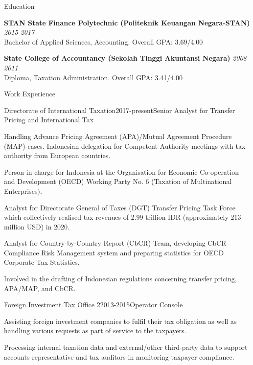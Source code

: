 \documentclass{resume}
\begin{document}
\begin{rSection}{Education}


{\bf STAN State Finance Polytechnic (Politeknik Keuangan Negara-STAN)} \hfill {\em 2015-2017} 
\\ Bachelor of Applied Sciences, Accounting.\hfill { Overall GPA: 3.69/4.00 }

{\bf State College of Accountancy (Sekolah Tinggi Akuntansi Negara)} \hfill {\em 2008-2011} 
\\ Diploma, Taxation Administration.\hfill { Overall GPA: 3.41/4.00 }

\end{rSection}

\begin{rSection}{Work Experience}
\begin{rSubsection}{Directorate of International Taxation}{2017-present}{Senior Analyst for Transfer Pricing and International Tax}{}
 \item Handling Advance Pricing Agreement (APA)/Mutual Agreement Procedure (MAP) cases. Indonesian delegation for Competent Authority meetings with tax authority from European countries.
 \item Person-in-charge for Indonesia at the Organisation for Economic Co-operation and Development (OECD) Working Party No. 6 (Taxation of Multinational Enterprises).
 \item Analyst for Directorate General of Taxes (DGT) Transfer Pricing Task Force which collectively realised tax revenues of 2.99 trillion IDR (approximately 213 million USD) in 2020.
 \item Analyst for Country-by-Country Report (CbCR) Team, developing CbCR Compliance Risk Management system and preparing statistics for OECD Corporate Tax Statistics.
 \item Involved in the drafting of Indonesian regulations concerning transfer pricing, APA/MAP, and CbCR.
\end{rSubsection}
\begin{rSubsection}{Foreign Investment Tax Office 2}{2013-2015}{Operator Console}{}
 \item Assisting foreign investment companies to fulfil their tax obligation as well as handling various requests as part of service to the taxpayers.
 \item Processing internal taxation data and external/other third-party data to support accounts representative and tax auditors in monitoring taxpayer compliance.
\end{rSubsection}
\end{rSection}
\end{document}
